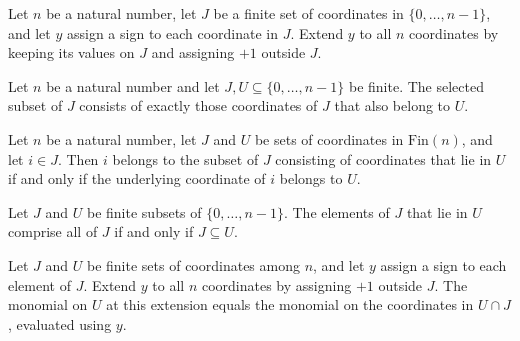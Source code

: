\begin{definition}
\label{FABL.granularityExtendAtOne}
\leanok
{}
Let $n$ be a natural number, let $J$ be a finite set of coordinates in
$\{0,\ldots,n-1\}$, and let $y$ assign a sign to each coordinate in $J$. Extend $y$ to
all $n$ coordinates by keeping its values on $J$ and assigning $+1$ outside $J$.
\end{definition}

\begin{definition}
\label{FABL.granularityFrequencyWithin}
\leanok
Let $n$ be a natural number and let $J,U\subseteq\{0,\ldots,n-1\}$ be finite. The
selected subset of $J$ consists of exactly those coordinates of $J$ that also belong to
$U$.
\end{definition}

\begin{theorem}
\label{FABL.mem_granularityFrequencyWithin}
\leanok
{}
Let $n$ be a natural number, let $J$ and $U$ be sets of coordinates in
$\mathrm{Fin}(n)$, and let $i\in J$. Then $i$ belongs to the subset of $J$ consisting
of coordinates that lie in $U$ if and only if the underlying coordinate of $i$ belongs
to $U$.
\end{theorem}

\begin{theorem}
\label{FABL.granularityFrequencyWithin_eq_univ_iff}
\leanok
{}
Let $J$ and $U$ be finite subsets of $\{0,\ldots,n-1\}$. The elements of $J$ that lie in
$U$ comprise all of $J$ if and only if $J\subseteq U$.
\end{theorem}

\begin{theorem}
\label{FABL.monomial_granularityExtendAtOne}
\leanok
{}
Let $J$ and $U$ be finite sets of coordinates among $n$, and let $y$ assign a sign to
each element of $J$. Extend $y$ to all $n$ coordinates by assigning $+1$ outside $J$.
The monomial on $U$ at this extension equals the monomial on the coordinates in $U\cap
J$, evaluated using $y$.
\end{theorem}

